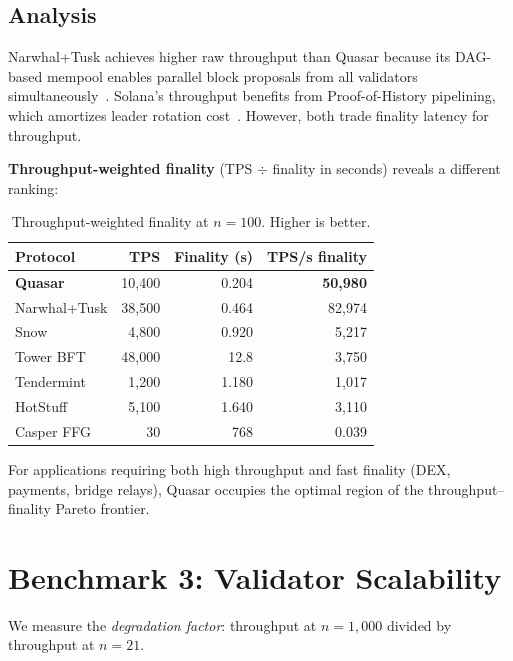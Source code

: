 \documentclass[11pt]{article}
\begin{document}
\subsection{Analysis}

Narwhal+Tusk achieves higher raw throughput than Quasar because its DAG-based mempool
enables parallel block proposals from all validators simultaneously~\cite{narwhal-tusk}.
Solana's throughput benefits from Proof-of-History pipelining, which amortizes leader
rotation cost~\cite{solana-wp}. However, both trade finality latency for throughput.

\textbf{Throughput-weighted finality} (TPS $\div$ finality in seconds) reveals a
different ranking:

\begin{table}[h]
\centering
\begin{tabular}{@{}lrrr@{}}
\toprule
\textbf{Protocol} & \textbf{TPS} & \textbf{Finality (s)} & \textbf{TPS/s finality} \\
\midrule
\textbf{Quasar}   & 10{,}400 & 0.204 & \textbf{50{,}980} \\
Narwhal+Tusk      & 38{,}500 & 0.464 & 82{,}974 \\
Snow              & 4{,}800  & 0.920 & 5{,}217 \\
Tower BFT         & 48{,}000 & 12.8  & 3{,}750 \\
Tendermint        & 1{,}200  & 1.180 & 1{,}017 \\
HotStuff          & 5{,}100  & 1.640 & 3{,}110 \\
Casper FFG        & 30       & 768   & 0.039 \\
\bottomrule
\end{tabular}
\caption{Throughput-weighted finality at $n=100$. Higher is better.}
\label{tab:tps-finality}
\end{table}

For applications requiring both high throughput and fast finality (DEX, payments, bridge
relays), Quasar occupies the optimal region of the throughput--finality Pareto frontier.

\section{Benchmark 3: Validator Scalability}
\label{sec:scalability}

We measure the \emph{degradation factor}: throughput at $n=1{,}000$ divided by
throughput at $n=21$.
\end{document}
